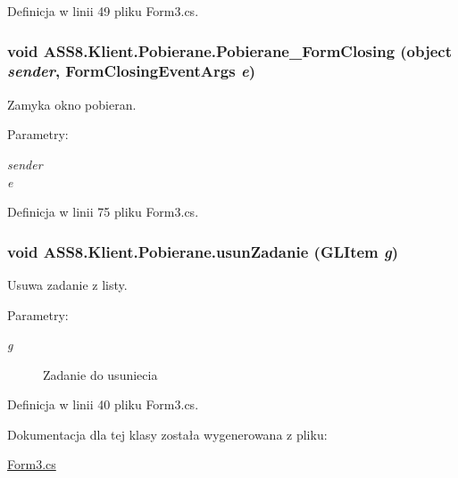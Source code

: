 Definicja w linii 49 pliku Form3.cs.\hypertarget{a00019_03c2ed674c8d50df0614a7f175eed42d}{
\subsubsection[{Pobierane\_\-FormClosing}]{\setlength{\rightskip}{0pt plus 5cm}void ASS8.Klient.Pobierane.Pobierane\_\-FormClosing (object {\em sender}, \/  FormClosingEventArgs {\em e})}}
\label{dd/da2/a00019_03c2ed674c8d50df0614a7f175eed42d}


Zamyka okno pobieran. 

\begin{Desc}
\item[Parametry:]
\begin{description}
\item[{\em sender}]\item[{\em e}]\end{description}
\end{Desc}


Definicja w linii 75 pliku Form3.cs.\hypertarget{a00019_06d8a33e39fdf38fa3955ce5c4a1abc4}{
\subsubsection[{usunZadanie}]{\setlength{\rightskip}{0pt plus 5cm}void ASS8.Klient.Pobierane.usunZadanie (GLItem {\em g})}}
\label{dd/da2/a00019_06d8a33e39fdf38fa3955ce5c4a1abc4}


Usuwa zadanie z listy. 

\begin{Desc}
\item[Parametry:]
\begin{description}
\item[{\em g}]Zadanie do usuniecia\end{description}
\end{Desc}


Definicja w linii 40 pliku Form3.cs.

Dokumentacja dla tej klasy została wygenerowana z pliku:\begin{CompactItemize}
\item 
\hyperlink{a00045}{Form3.cs}\end{CompactItemize}
